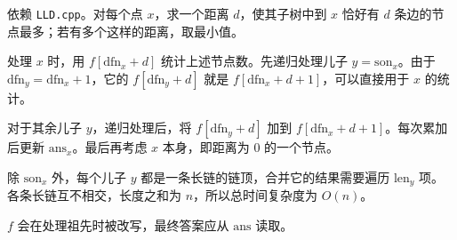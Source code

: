 依赖 \texttt{LLD.cpp}。对每个点 $x$，求一个距离 $d$，使其子树中到 $x$ 恰好有 $d$ 条边的节点最多；若有多个这样的距离，取最小值。

处理 $x$ 时，用 $f[\mathrm{dfn}_x+d]$ 统计上述节点数。先递归处理儿子 $y=\mathrm{son}_x$。由于 $\mathrm{dfn}_y=\mathrm{dfn}_x+1$，它的 $f[\mathrm{dfn}_y+d]$ 就是 $f[\mathrm{dfn}_x+d+1]$，可以直接用于 $x$ 的统计。

对于其余儿子 $y$，递归处理后，将 $f[\mathrm{dfn}_y+d]$ 加到 $f[\mathrm{dfn}_x+d+1]$。每次累加后更新 $\mathrm{ans}_x$。最后再考虑 $x$ 本身，即距离为 $0$ 的一个节点。

除 $\mathrm{son}_x$ 外，每个儿子 $y$ 都是一条长链的链顶，合并它的结果需要遍历 $\mathrm{len}_y$ 项。各条长链互不相交，长度之和为 $n$，所以总时间复杂度为 $O(n)$。

$f$ 会在处理祖先时被改写，最终答案应从 $\mathrm{ans}$ 读取。
